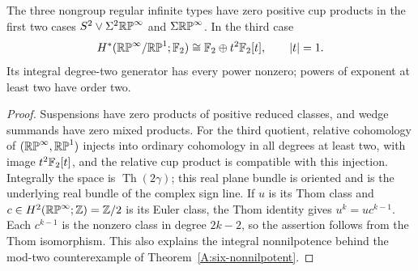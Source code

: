 \begin{corollary}\label{E:six-rings}
The three nongroup regular infinite types have zero positive cup products
in the first two cases $S^2\vee\Sigma^2\mathbb {RP}^\infty$ and
$\Sigma\mathbb {RP}^\infty$. In the third case
\[
 H^*(\mathbb {RP}^\infty/\mathbb {RP}^1;\mathbb F_2)
 \cong\mathbb F_2\oplus t^2\mathbb F_2[t],\qquad |t|=1.
\]
Its integral degree-two generator has every power nonzero; powers of
exponent at least two have order two.
\end{corollary}
\begin{proof}
Suspensions have zero products of positive reduced classes, and wedge
summands have zero mixed products. For the third quotient, relative
cohomology of $(\mathbb {RP}^\infty,\mathbb {RP}^1)$ injects into ordinary cohomology in
all degrees at least two, with image $t^2\mathbb F_2[t]$, and the relative cup
product is compatible with this injection. Integrally the space is
$\operatorname{Th}(2\gamma)$; this real plane bundle is oriented and is
the underlying real bundle of the complex sign line. If $u$ is its Thom
class and $c\in H^2(\mathbb {RP}^\infty;\mathbb Z)=\mathbb Z/2$ is its Euler class, the Thom
identity gives $u^k=u c^{k-1}$. Each $c^{k-1}$ is the nonzero class in
degree $2k-2$, so the assertion follows from the Thom isomorphism.
This also explains the integral nonnilpotence behind the mod-two
counterexample of Theorem~\ref{A:six-nonnilpotent}.
\end{proof}

